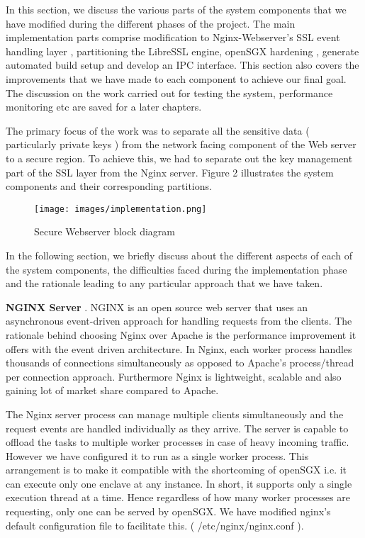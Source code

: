 \documentclass[../main.tex]{subfiles}
\begin{document}
In this section,  we discuss the various parts of the system components that we have modified during the different phases of the project. The main implementation parts comprise modification to Nginx-Webserver’s SSL event handling layer , partitioning the LibreSSL engine, openSGX hardening , generate automated build setup and develop an IPC interface.  This  section also covers the improvements that we have made to  each component to achieve our final goal. The discussion on the work carried out  for testing the system, performance monitoring etc are  saved for a later chapters.

The primary focus of the work was to separate all the sensitive data ( particularly  private keys ) from the network facing component of the Web server to a secure region. To achieve this, we had to separate out the key management part of the SSL layer from the Nginx server. 
Figure 2 illustrates the system components and their corresponding partitions. 

\begin{figure}[H]
  \centering
  \texttt{[image: images/implementation.png]}
  \caption{Secure Webserver block diagram }
  \label{fig:implementation-overview}
\end{figure}

In the following section,  we briefly discuss about the different aspects of each of the system components, the difficulties faced during the implementation phase and the rationale leading to any particular approach that we have taken. 

\textbf{NGINX Server }.
NGINX is an open source web server that uses an asynchronous event-driven approach for handling requests from the clients. The rationale behind choosing Nginx over Apache is the performance improvement it offers with the event driven architecture. In Nginx, each worker process handles thousands of connections simultaneously as opposed to Apache’s process/thread per connection approach. Furthermore Nginx is lightweight, scalable and also gaining lot of market share compared to Apache.

The Nginx server process can manage multiple clients simultaneously and the request events are handled individually as they arrive. The server is capable to offload  the tasks to multiple worker processes in case of heavy incoming traffic. However we have configured it to run as a single worker process. This arrangement is to make it compatible with the shortcoming of openSGX i.e. it can execute only one enclave at any instance. In short, it supports only a  single execution thread at a time. Hence regardless of how many worker processes are requesting, only one can be served by openSGX.  We have modified nginx’s default configuration file to facilitate this.  (  /etc/nginx/nginx.conf ).  
\end{document}
